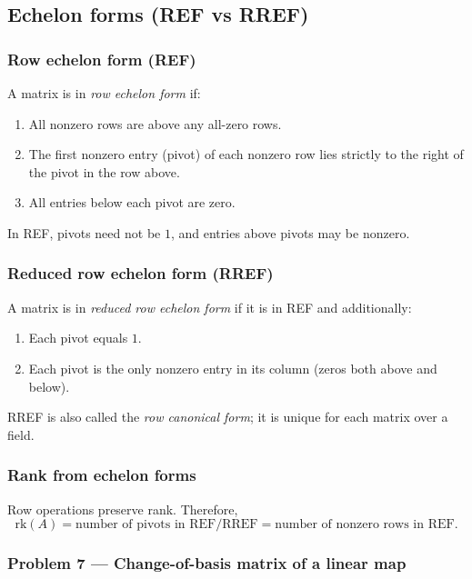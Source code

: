 \documentclass[12pt,a4paper]{article}
\theoremstyle{plain}
\theoremstyle{definition}      %
\begin{document}
\subsection*{Echelon forms (REF vs RREF)}

\subsubsection*{Row echelon form (REF)}
A matrix is in \emph{row echelon form} if:
\begin{enumerate}
	\item All nonzero rows are above any all-zero rows.
	\item The first nonzero entry (pivot) of each nonzero row lies strictly to the right of the pivot in the row above.
	\item All entries below each pivot are zero.
\end{enumerate}
In REF, pivots need not be $1$, and entries above pivots may be nonzero.

\subsubsection*{Reduced row echelon form (RREF)}
A matrix is in \emph{reduced row echelon form} if it is in REF and additionally:
\begin{enumerate}
	\item[(4)] Each pivot equals $1$.
	\item[(5)] Each pivot is the only nonzero entry in its column (zeros both above and below).
\end{enumerate}
RREF is also called the \emph{row canonical form}; it is unique for each matrix over a field.

\subsubsection*{Rank from echelon forms}
Row operations preserve rank. Therefore,
\[
\mathrm{rk}(A)=\text{number of pivots in REF/RREF}
=\text{number of nonzero rows in REF}.
\]

\subsubsection*{Problem 7 — Change-of-basis matrix of a linear map}
\end{document}
